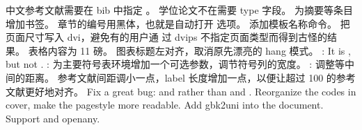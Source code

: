 \markdownRendererUlItem 中文参考文献需要在 bib 中指定 。\markdownRendererUlItemEnd 
\markdownRendererUlItem 学位论文不在需要 type 字段。\markdownRendererUlItemEnd 
\markdownRendererUlItem 为摘要等条目增加书签。\markdownRendererUlItemEnd 
\markdownRendererUlItem 章节的编号用黑体，也就是自动打开  选项。\markdownRendererUlItemEnd 
\markdownRendererUlItem 添加模板名称命令。\markdownRendererUlItemEnd 
\markdownRendererUlItem 把页面尺寸写入 dvi，避免有的用户通 过 dvips 不指定页面类型而得到古怪的结果。\markdownRendererUlItemEnd 
\markdownRendererUlItem 表格内容为 11 磅。\markdownRendererUlItemEnd 
\markdownRendererUlItem 图表标题左对齐，取消原先漂亮的 hang 模式。\markdownRendererUlItemEnd 
\markdownRendererUlItem {}: It is , but not .\markdownRendererUlItemEnd 
\markdownRendererUlItem {}: 为主要符号表环境增加一个可选参数，调节符号列的宽度。\markdownRendererUlItemEnd 
\markdownRendererUlItem {}: 调整等中间的距离。\markdownRendererUlItemEnd 
\markdownRendererUlItem 参考文献间距调小一点，label 长度增加一点，以便让超过 100 的参考文献更好地对齐。\markdownRendererUlItemEnd 
\markdownRendererUlEnd \markdownRendererInterblockSeparator
{}
\markdownRendererSectionEnd 
\markdownRendererSectionEnd \markdownRendererSectionBegin
{}\markdownRendererInterblockSeparator
{}\markdownRendererSectionBegin
{}\markdownRendererInterblockSeparator
{}\markdownRendererUlBegin
\markdownRendererUlItem Fix a great bug:  and  rather than  and .\markdownRendererUlItemEnd 
\markdownRendererUlItem Reorganize the codes in cover, make the pagestyle more readable.\markdownRendererUlItemEnd 
\markdownRendererUlItem Add gbk2uni into the document.\markdownRendererUlItemEnd 
\markdownRendererUlItem Support  and openany.\markdownRendererUlItemEnd 
